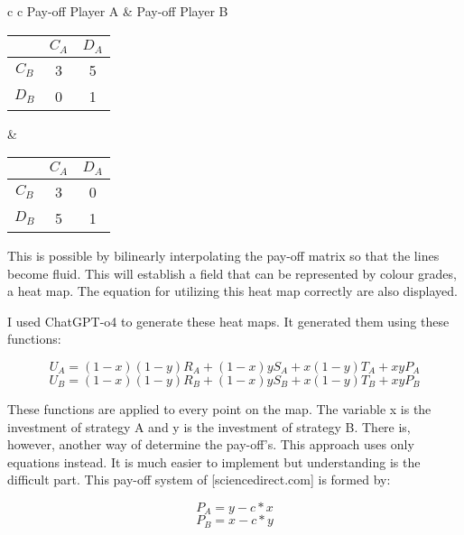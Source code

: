\documentclass{article}
\begin{document}
\begin{itemize}
\begin{center}
\begin{tabular}{ c c }
Pay-off Player A & Pay-off Player B\\
\begin{tabular}{ c|c|c }
   & $C_A$ & $D_A$ \\ 
   \hline
 $C_B$ & 3 & 5\\  
   \hline
 $D_B$ & 0 & 1
\end{tabular}
&
\begin{tabular}{ c|c|c }
   & $C_A$ & $D_A$ \\ 
   \hline
 $C_B$ & 3 & 0\\  
   \hline
 $D_B$ & 5 & 1
\end{tabular}
\end{tabular}
\end{center}

This is possible by bilinearly interpolating the pay-off matrix so that the lines become fluid.
This will establish a field that can be represented by colour grades, a heat map.
The equation for utilizing this heat map correctly are also displayed.


I used ChatGPT-o4 to generate these heat maps.
It generated them using these functions:

$$U_A = (1-x)(1-y)R_A + (1-x)yS_A + x(1-y)T_A + xyP_A$$
$$U_B = (1-x)(1-y)R_B + (1-x)yS_B + x(1-y)T_B + xyP_B$$

These functions are applied to every point on the map.
The variable x is the investment of strategy A and y is the investment of strategy B.
There is, however, another way of determine the pay-off's.
This approach uses only equations instead.
It is much easier to implement but understanding is the difficult part.
This pay-off system of [sciencedirect.com] is formed by:

$$P_A = y - c*x$$
$$P_B = x - c*y$$


\end{itemize}
\end{document}
